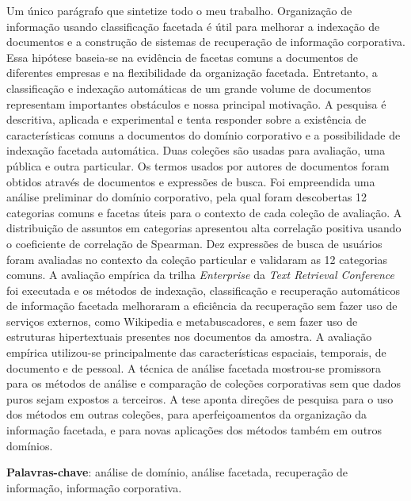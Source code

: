 \documentclass[
	11pt,				%
	openright,			%
	oneside,			%
	a4paper,			%
	english,			%
	french,				%
	spanish,			%
	brazil,				%
	]{abntex2}
\begin{document}
\setlength{\absparsep}{18pt} %
\begin{resumo}

\noindent 
Um único parágrafo que sintetize todo o meu trabalho. Organização de informação usando classificação facetada é útil para melhorar a indexação de documentos e a construção de sistemas de recuperação de informação corporativa. Essa hipótese baseia-se na evidência de facetas comuns a documentos de diferentes empresas e na flexibilidade da organização facetada. Entretanto, a classificação e indexação automáticas de um grande volume de documentos representam importantes obstáculos e nossa principal motivação. A pesquisa é descritiva, aplicada e experimental e tenta responder sobre a existência de características comuns a documentos do domínio corporativo e a possibilidade de indexação facetada automática. Duas coleções são usadas para avaliação, uma pública e outra particular. Os termos usados por autores de documentos foram obtidos através de documentos e expressões de busca. Foi empreendida uma análise preliminar do domínio corporativo, pela qual foram descobertas 12 categorias comuns e facetas úteis para o contexto de cada coleção de avaliação. A distribuição de assuntos em categorias apresentou alta correlação positiva usando o coeficiente de correlação de Spearman. Dez expressões de busca de usuários foram avaliadas no contexto da coleção particular e validaram as 12 categorias comuns. A avaliação empírica da trilha \textit{Enterprise} da \textit{Text Retrieval Conference} foi executada e os métodos de indexação, classificação e recuperação automáticos de informação facetada melhoraram a eficiência da recuperação sem fazer uso de serviços externos, como Wikipedia e metabuscadores, e sem fazer uso de estruturas hipertextuais presentes nos documentos da amostra. A avaliação empírica utilizou-se principalmente das características espaciais, temporais, de documento e de pessoal. A técnica de análise facetada mostrou-se promissora para os métodos de análise e comparação de coleções corporativas sem que dados puros sejam expostos a terceiros. A tese aponta direções de pesquisa para o uso dos métodos em outras coleções, para aperfeiçoamentos da organização da informação facetada, e para novas aplicações dos métodos também em outros domínios.

\noindent 
\textbf{Palavras-chave}: análise de domínio, análise facetada, recuperação de informação, informação corporativa.

\end{resumo}
\end{document}
